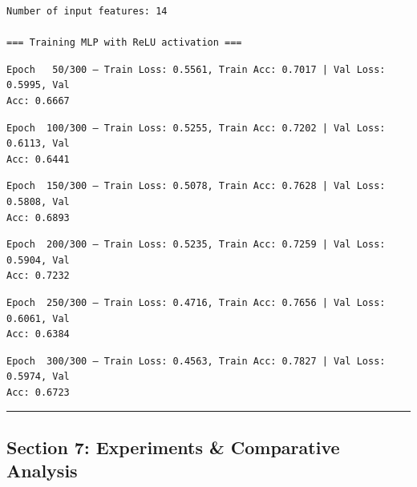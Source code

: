 \documentclass[11pt]{article}
\begin{document}
    \begin{Verbatim}[commandchars=\\\{\}]
Number of input features: 14

=== Training MLP with ReLU activation ===
    \end{Verbatim}

    \begin{Verbatim}[commandchars=\\\{\}]
Epoch   50/300 — Train Loss: 0.5561, Train Acc: 0.7017 | Val Loss: 0.5995, Val
Acc: 0.6667
    \end{Verbatim}

    \begin{Verbatim}[commandchars=\\\{\}]
Epoch  100/300 — Train Loss: 0.5255, Train Acc: 0.7202 | Val Loss: 0.6113, Val
Acc: 0.6441
    \end{Verbatim}

    \begin{Verbatim}[commandchars=\\\{\}]
Epoch  150/300 — Train Loss: 0.5078, Train Acc: 0.7628 | Val Loss: 0.5808, Val
Acc: 0.6893
    \end{Verbatim}

    \begin{Verbatim}[commandchars=\\\{\}]
Epoch  200/300 — Train Loss: 0.5235, Train Acc: 0.7259 | Val Loss: 0.5904, Val
Acc: 0.7232
    \end{Verbatim}

    \begin{Verbatim}[commandchars=\\\{\}]
Epoch  250/300 — Train Loss: 0.4716, Train Acc: 0.7656 | Val Loss: 0.6061, Val
Acc: 0.6384
    \end{Verbatim}

    \begin{Verbatim}[commandchars=\\\{\}]
Epoch  300/300 — Train Loss: 0.4563, Train Acc: 0.7827 | Val Loss: 0.5974, Val
Acc: 0.6723
    \end{Verbatim}

    \begin{center}\rule{0.5\linewidth}{0.5pt}\end{center}

\subsection{Section 7: Experiments \& Comparative
Analysis}\label{section-7-experiments-comparative-analysis}
\end{document}
